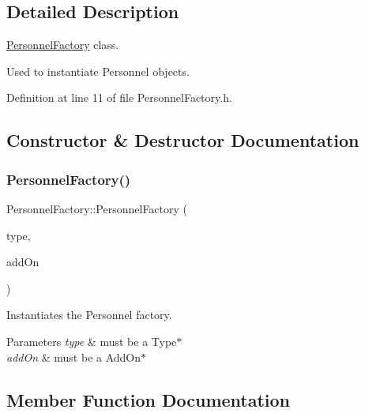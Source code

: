 \subsection{Detailed Description}
\hyperlink{classPersonnelFactory}{Personnel\+Factory} class. 

Used to instantiate Personnel objects. 

Definition at line 11 of file Personnel\+Factory.\+h.



\subsection{Constructor \& Destructor Documentation}
\mbox{\label{classPersonnelFactory_a71cd406976230cacebfcfd723d2a2615}} 
\subsubsection{\texorpdfstring{Personnel\+Factory()}{PersonnelFactory()}}
{\footnotesize\ttfamily Personnel\+Factory\+::\+Personnel\+Factory (\begin{DoxyParamCaption}\item[{\hyperlink{classType}{Type} $\ast$}]{type,  }\item[{\hyperlink{classAddOn}{Add\+On} $\ast$}]{add\+On }\end{DoxyParamCaption})}



Instantiates the Personnel factory. 


\begin{DoxyParams}{Parameters}
{\em type} & must be a Type$\ast$ \\
\hline
{\em add\+On} & must be a Add\+On$\ast$ \\
\hline
\end{DoxyParams}


\subsection{Member Function Documentation}
\mbox{\label{classPersonnelFactory_ad60e8371e52153294112b16a7a97cc2d}} 
